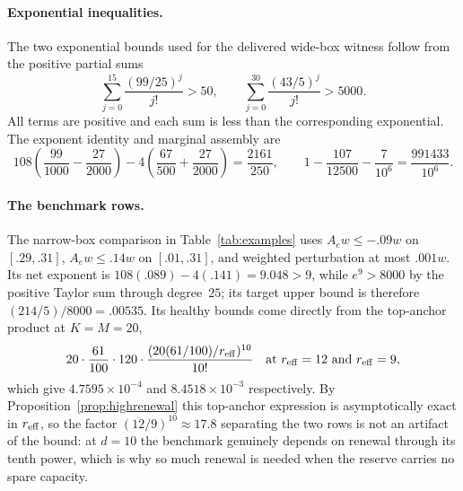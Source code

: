 \paragraph{Exponential inequalities.}
The two exponential bounds used for the delivered wide-box witness follow from the positive partial sums
\[
 \sum_{j=0}^{15}\frac{(99/25)^j}{j!}>50,\qquad
 \sum_{j=0}^{30}\frac{(43/5)^j}{j!}>5000 .
\]
All terms are positive and each sum is less than the corresponding exponential. The exponent identity and marginal assembly are
\[
 108\left(\frac{99}{1000}-\frac{27}{2000}\right)
 -4\left(\frac{67}{500}+\frac{27}{2000}\right)=\frac{2161}{250},
 \qquad
 1-\frac{107}{12500}-\frac7{10^6}=\frac{991433}{10^6}.
\]

\paragraph{The benchmark rows.}
The narrow-box comparison in Table~\ref{tab:examples} uses $A_ew\le-.09w$ on $[.29,.31]$, $A_ew\le.14w$ on $[.01,.31]$, and weighted perturbation at most $.001w$. Its net exponent is $108(.089)-4(.141)=9.048>9$, while $e^9>8000$ by the positive Taylor sum through degree~$25$; its target upper bound is therefore $(214/5)/8000=.00535$. Its healthy bounds come directly from the top-anchor product at $K=M=20$,
\[
 20\cdot\frac{61}{100}\cdot120\cdot\frac{(20(61/100)/r_{\mathrm{eff}})^{10}}{10!}
 \quad\text{at }r_{\mathrm{eff}}=12\text{ and }r_{\mathrm{eff}}=9,
\]
which give $4.7595\times10^{-4}$ and $8.4518\times10^{-3}$ respectively. By Proposition~\ref{prop:highrenewal} this top-anchor expression is asymptotically exact in $r_{\mathrm{eff}}$, so the factor $(12/9)^{10}\approx17.8$ separating the two rows is not an artifact of the bound: at $d=10$ the benchmark genuinely depends on renewal through its tenth power, which is why so much renewal is needed when the reserve carries no spare capacity.
